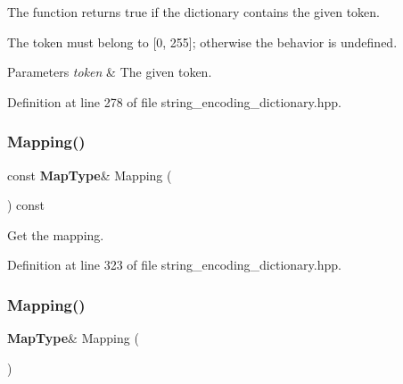 The function returns true if the dictionary contains the given token. 

The token must belong to [0, 255]; otherwise the behavior is undefined.


\begin{DoxyParams}{Parameters}
{\em token} & The given token. \\
\hline
\end{DoxyParams}


Definition at line 278 of file string\+\_\+encoding\+\_\+dictionary.\+hpp.

\mbox{\label{classmlpack_1_1data_1_1StringEncodingDictionary_3_01int_01_4_aa2eae80cec94bbeb1f8bc25367fc0305}} 
\subsubsection{Mapping()\hspace{0.1cm}{\footnotesize\ttfamily [1/2]}}
{\footnotesize\ttfamily const \textbf{ Map\+Type}\& Mapping (\begin{DoxyParamCaption}{ }\end{DoxyParamCaption}) const\hspace{0.3cm}{\ttfamily [inline]}}



Get the mapping. 



Definition at line 323 of file string\+\_\+encoding\+\_\+dictionary.\+hpp.

\mbox{\label{classmlpack_1_1data_1_1StringEncodingDictionary_3_01int_01_4_a11a693fe23d0648d295d6715304e4130}} 
\subsubsection{Mapping()\hspace{0.1cm}{\footnotesize\ttfamily [2/2]}}
{\footnotesize\ttfamily \textbf{ Map\+Type}\& Mapping (\begin{DoxyParamCaption}{ }\end{DoxyParamCaption})\hspace{0.3cm}{\ttfamily [inline]}}



